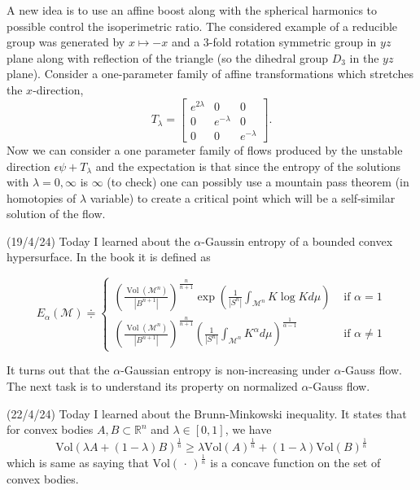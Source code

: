 \documentclass[12pt,a4paper]{article}
\newcommand{\R}{\mathbb{R}}
\begin{document}
A new idea is to use an affine boost along with the spherical harmonics to possible control the isoperimetric ratio. The considered example of a reducible group was generated by $ x \mapsto -x $ and a $ 3 $-fold rotation symmetric group in $ yz $ plane along with reflection of the triangle (so the dihedral group $ D_{3} $ in the $ yz $ plane). Consider a one-parameter family of affine transformations which stretches the $ x $-direction, 
\[ T_{\lambda} = \begin{bmatrix}
    e^{2\lambda} & 0 & 0 \\
    0 & e^{-\lambda} & 0 \\
    0 & 0 & e^{-\lambda}
\end{bmatrix}. \]
Now we can consider a one parameter family of flows produced by the unstable direction $ \epsilon \psi + T_{\lambda} $ and the expectation is that since the entropy of the solutions with $ \lambda = 0, \infty $ is $ \infty $ (to check) one can possibly use a mountain pass theorem (in homotopies of $ \lambda $ variable) to create a critical point which will be a self-similar solution of the flow.

(19/4/24) Today I learned about the $ \alpha $-Gaussin entropy of a bounded convex hypersurface. In the book it is defined as 

\[ E_\alpha(\mathcal{M}) \doteqdot
\begin{cases}\left(\frac{\operatorname{Vol}\left(\mathcal{M}^n\right)}{\left|B^{n+1}\right|}\right)^{\frac{n}{n+1}} \exp \left(\frac{1}{\left|S^n\right|} \int_{\mathcal{M}^n} K \log K d \mu\right) & \text { if } \alpha=1 \\ \left(\frac{\operatorname{Vol}\left(\mathcal{M}^n\right)}{\left|B^{n+1}\right|}\right)^{\frac{n}{n+1}}\left(\frac{1}{\left|S^n\right|} \int_{\mathcal{M}^n} K^\alpha d \mu\right)^{\frac{1}{\alpha-1}} & \text { if } \alpha \neq 1\end{cases} \]

It turns out that the $ \alpha $-Gaussian entropy is non-increasing under $ \alpha $-Gauss flow. The next task is to understand its property on normalized $ \alpha $-Gauss flow.

(22/4/24) Today I learned about the Brunn-Minkowski inequality. It states that for convex bodies $ A, B \subset \R^{n} $ and $ \lambda \in [0,1] $, we have 
\[ \text{Vol}(\lambda A + (1- \lambda)B)^{\frac{1}{n}} \ge \lambda \text{Vol}(A)^{\frac{1}{n}} + (1 - \lambda)\text{Vol}(B)^{\frac{1}{n}} \]
which is same as saying that $ \text{Vol}(\, \cdot \,)^{\frac{1}{n}} $ is a concave function on the set of convex bodies.
\end{document}
